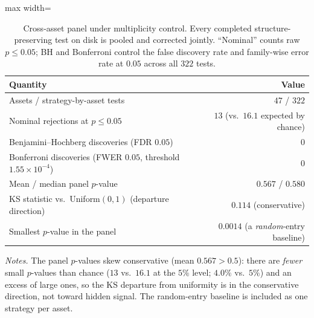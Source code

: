 \documentclass[preprint,12pt]{elsarticle}
\theoremstyle{definition}
\begin{document}
\begin{table}[H]
\centering
\caption{Cross-asset panel under multiplicity control. Every completed structure-preserving test on disk is pooled and corrected jointly. ``Nominal'' counts raw $p\le0.05$; BH and Bonferroni control the false discovery rate and family-wise error rate at $0.05$ across all $322$ tests.}
\label{tab:cross_asset_multiplicity}
{\small
\renewcommand{\arraystretch}{1.12}
\begin{adjustbox}{max width=\textwidth}
\begin{tabular}{@{}lr@{}}
\toprule
Quantity & Value \\
\midrule
Assets / strategy-by-asset tests & $47$ / $322$ \\
Nominal rejections at $p\le0.05$ & $13$ (vs.\ $16.1$ expected by chance) \\
Benjamini--Hochberg discoveries (FDR $0.05$) & $0$ \\
Bonferroni discoveries (FWER $0.05$, threshold $1.55\times10^{-4}$) & $0$ \\
Mean / median panel $p$-value & $0.567$ / $0.580$ \\
KS statistic vs.\ Uniform$(0,1)$ (departure direction) & $0.114$ (conservative) \\
Smallest $p$-value in the panel & $0.0014$ (a \emph{random}-entry baseline) \\
\bottomrule
\end{tabular}
\end{adjustbox}
}
\par\vspace{0.5em}
\begin{minipage}{0.95\textwidth}
\centering
\footnotesize\emph{Notes.} The panel $p$-values skew conservative (mean $0.567>0.5$): there are \emph{fewer} small $p$-values than chance ($13$ vs.\ $16.1$ at the $5\%$ level; $4.0\%$ vs.\ $5\%$) and an excess of large ones, so the KS departure from uniformity is in the conservative direction, not toward hidden signal. The random-entry baseline is included as one strategy per asset.
\end{minipage}
\end{table}
\end{document}
